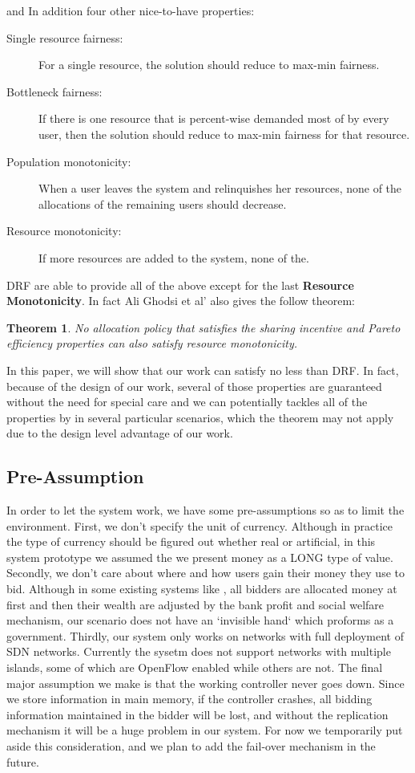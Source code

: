 \documentclass[a4paper,11pt,twocolumn]{article}
\begin{document}
and In addition  four
other nice-to-have properties:

\begin{description}

\item 
[Single resource fairness:] 
For a single resource, the
solution should reduce to max-min fairness.
\item 
[Bottleneck fairness:]
 If there is one resource that is
percent-wise demanded most of by every user, then
the solution should reduce to max-min fairness for
that resource.
\item 
[Population monotonicity:]
When a user leaves the
system and relinquishes her resources, none of the
allocations of the remaining users should decrease.
\item 
[Resource monotonicity:]
If more resources are added
to the system, none of the.
\end{description}

DRF are able to provide all of the above except for the last \textbf{Resource Monotonicity}.
In fact Ali Ghodsi et al' also gives the follow theorem:
\newtheorem{thm}{Theorem}
\begin{thm}
 No allocation policy that satisfies the sharing incentive and Pareto efficiency properties can also
satisfy resource monotonicity.
\end{thm}

In this paper, we will show that our work can satisfy no less than DRF. In fact, because of the design of our work, several of 
those properties are guaranteed without the need for special care and we can   potentially tackles all of the
properties by in several particular scenarios, which the theorem may not apply due to the design level advantage of our work.

\subsection{Pre-Assumption}
In order to let the system work, we have some pre-assumptions so as to limit the environment. First, we don't specify the unit of 
currency. Although in practice the type of currency should be figured out whether real or artificial, in this system prototype we assumed
the we present money as a LONG type of value. Secondly, we don't care about where and how users gain their money they use to bid. Although in
some existing systems like \cite{ucsd}, all bidders are allocated money at first and then their wealth are adjusted by the bank profit and 
social welfare mechanism, our scenario does not have an `invisible hand` which proforms as a government. Thirdly, our system only works on 
networks with full deployment of SDN networks. Currently the sysetm does not support networks with multiple islands, some of which are 
OpenFlow enabled while others are not. The final major assumption we make is that the working controller never goes down. Since we store 
information in main memory, if the controller crashes, all bidding information maintained in the bidder will be lost, and without the 
replication mechanism it will be a huge problem in our system. For now we temporarily put aside this consideration, and we plan to add
the fail-over mechanism in the future. 
\end{document}
